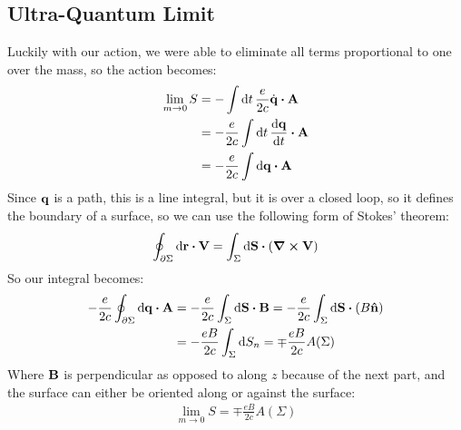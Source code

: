 \documentclass[12pt]{article}
\newcommand{\q}{\vb{q}}
\begin{document}
\subsection{Ultra-Quantum Limit}
Luckily with our action, we were able to eliminate all terms proportional to one over the mass, so the action becomes:
\begin{align*}
  \lim_{m\to0}S&=-\int\dd{t}\frac{e}{2c}\dot{\q}\vdot\vb{A}\\
  &=-\frac{e}{2c}\int\dd{t}\dv{\q}{t}\vdot\vb{A}\\
  &=-\frac{e}{2c}\int\dd{\q}\vdot\vb{A}
\end{align*}
Since $\q$ is a path, this is a line integral, but it is over a closed loop, so it defines the boundary of a surface, so we can use the following form of Stokes' theorem:
\begin{align*}
  \oint_{\partial\Sigma}\dd{\vb{r}}\vdot\vb{V}=
  \int_\Sigma\dd{\vb{S}}\vdot\qty(\curl{\vb{V}})
\end{align*}
So our integral becomes:
\begin{align*}
  -\frac{e}{2c}\oint_{\partial\Sigma}\dd{\q}\vdot\vb{A}
  &=-\frac{e}{2c}\int_\Sigma\dd{\vb{S}}\vdot\vb{B}
  =-\frac{e}{2c}\int_\Sigma\dd{\vb{S}}\vdot(B\vu{n})\\
  &=-\frac{eB}{2c}\int_\Sigma\dd{S_n}=\mp\frac{eB}{2c}A(\Sigma)
\end{align*}
Where $\vb{B}$ is perpendicular as opposed to along $z$ because of the next part, and the surface can either be oriented along or against the surface:
\begin{align*}
  \boxed{\lim_{m\to0}S=\mp\frac{eB}{2c}A(\Sigma)}
\end{align*}
\end{document}
